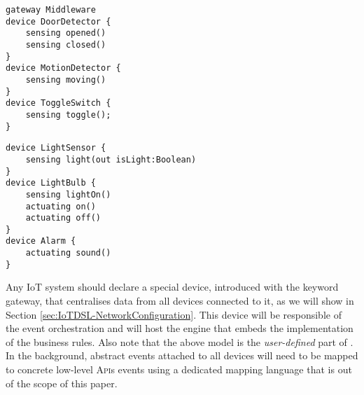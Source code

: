 \begin{table}
	\begin{minipage}[b]{.45\textwidth }%
		\begin{lstlisting}[language=iotdsl]	
gateway Middleware
device DoorDetector {
	sensing opened()
	sensing closed()
}
device MotionDetector {
	sensing moving()
}
device ToggleSwitch {
	sensing toggle();
}
		\end{lstlisting}
	\end{minipage}\hfill%
	\begin{minipage}[b]{.45\textwidth}
		\begin{lstlisting}[language=iotdsl, firstnumber=12]
device LightSensor {
	sensing light(out isLight:Boolean)
}
device LightBulb {
	sensing lightOn()
	actuating on()
	actuating off()
}	
device Alarm {
	actuating sound()
}
    \end{lstlisting}
	\end{minipage}
\label{lis:RE-TypeDeclarations}
\end{table}

Any IoT system should declare a special device, introduced with the keyword \textsf{gateway}, that centralises data from all devices connected to it, as we will show in Section \ref{sec:IoTDSL-NetworkConfiguration}. This device will be responsible of the event orchestration and will host the \CEP engine that embeds the implementation of the business rules. Also note that the above model is the \textit{user-defined} part of \IOTDSL. In the background, abstract events attached to all devices will need to be mapped to concrete low-level \textsc{Api}s events using a dedicated mapping language that is out of the scope of this paper.

